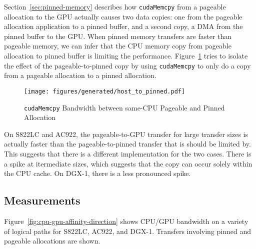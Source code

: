Section~\ref{sec:pinned-memory} describes how \texttt{cudaMemcpy} from a pageable allocation to the GPU actually causes two data copies: one from the pageable allocation application to a pinned buffer, and a second copy, a DMA from the pinned buffer to the GPU.
When pinned memory transfers are faster than pageable memory, we can infer that the CPU memory copy from pageable allocation to pinned buffer is limiting the performance.
Figure~\ref{fig:explicit-pageable-cpu} tries to isolate the effect of the pageable-to-pinned copy by using \texttt{cudaMemcpy} to only do a copy from a pageable allocation to a pinned allocation.

\begin{figure}[H]
	\centering
	\texttt{[image: figures/generated/host\_to\_pinned.pdf]}
	\caption[Intra-CPU \texttt{cudaMemcpy} Bandwidth]{
        \texttt{cudaMemcpy} Bandwidth between same-CPU Pageable and Pinned Allocation
    }
	\label{fig:explicit-pageable-cpu}
\end{figure}

On S822LC and AC922, the pageable-to-GPU transfer for large transfer sizes is actually faster than the pageable-to-pinned transfer that is should be limited by.
This suggests that there is a different implementation for the two cases.
There is a spike at itermediate sizes, which suggests that the copy can occur solely within the CPU cache.
On DGX-1, there is a less pronounced spike.

\subsection{Measurements}

Figure~\ref{fig:cpu-gpu-affinity-direction} shows CPU/GPU bandwidth on a variety of logical paths for S822LC, AC922, and DGX-1.
Transfers involving pinned and pageable allocations are shown.

